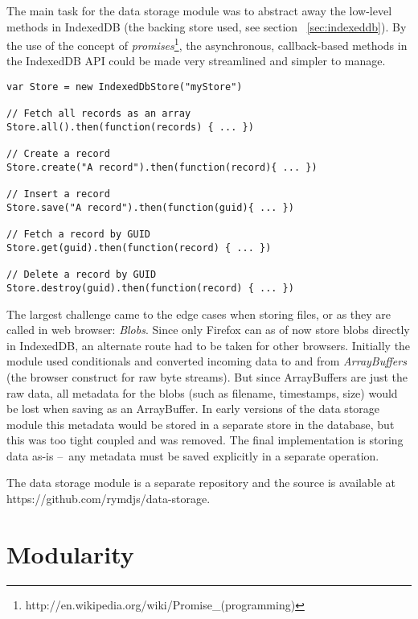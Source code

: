 The main task for the data storage module was to abstract away the low-level methods in IndexedDB (the backing store used, see section ~\ref{sec:indexeddb}). By the use of the concept of \emph{promises}\footnote{http://en.wikipedia.org/wiki/Promise_(programming)}, the asynchronous, callback-based methods in the IndexedDB API could be made very streamlined and simpler to manage.

\begin{Code}
\begin{lstlisting}[caption=Common database operations]
var Store = new IndexedDbStore("myStore")

// Fetch all records as an array
Store.all().then(function(records) { ... })

// Create a record
Store.create("A record").then(function(record){ ... })

// Insert a record
Store.save("A record").then(function(guid){ ... })

// Fetch a record by GUID
Store.get(guid).then(function(record) { ... })

// Delete a record by GUID
Store.destroy(guid).then(function(record) { ... })
\end{lstlisting}
\end{Code}

The largest challenge came to the edge cases when storing files, or as they are called in web browser: \emph{Blobs}. Since only Firefox can as of now store blobs directly in IndexedDB, an alternate route had to be taken for other browsers. Initially the module used conditionals and converted incoming data to and from \emph{ArrayBuffers} (the browser construct for raw byte streams). But since ArrayBuffers are just the raw data, all metadata for the blobs (such as filename, timestamps, size) would be lost when saving as an ArrayBuffer. In early versions of the data storage module this metadata would be stored in a separate store in the database, but this was too tight coupled and was removed. The final implementation is storing data as-is – any metadata must be saved explicitly in a separate operation.

The data storage module is a separate repository and the source is available at https://github.com/rymdjs/data-storage.

\section{Modularity}

